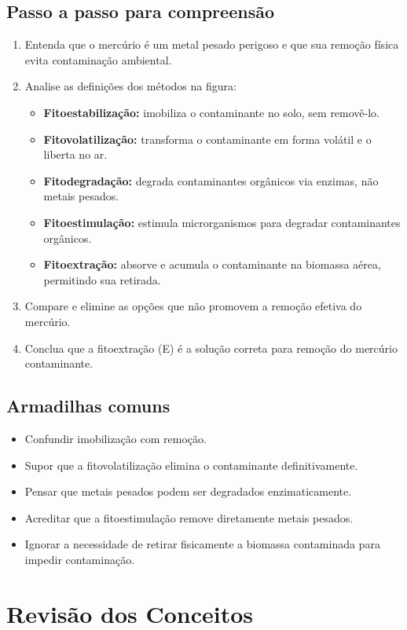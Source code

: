 \documentclass{article}
\begin{document}
\subsection*{Passo a passo para compreensão}
\begin{enumerate}
  \item Entenda que o mercúrio é um metal pesado perigoso e que sua remoção física evita contaminação ambiental.
  \item Analise as definições dos métodos na figura:
  \begin{itemize}
    \item \textbf{Fitoestabilização:} imobiliza o contaminante no solo, sem removê-lo.
    \item \textbf{Fitovolatilização:} transforma o contaminante em forma volátil e o liberta no ar.
    \item \textbf{Fitodegradação:} degrada contaminantes orgânicos via enzimas, não metais pesados.
    \item \textbf{Fitoestimulação:} estimula microrganismos para degradar contaminantes orgânicos.
    \item \textbf{Fitoextração:} absorve e acumula o contaminante na biomassa aérea, permitindo sua retirada.
  \end{itemize}
  \item Compare e elimine as opções que não promovem a remoção efetiva do mercúrio.
  \item Conclua que a fitoextração (E) é a solução correta para remoção do mercúrio contaminante.
\end{enumerate}

\subsection*{Armadilhas comuns}
\begin{itemize}
  \item Confundir imobilização com remoção.
  \item Supor que a fitovolatilização elimina o contaminante definitivamente.
  \item Pensar que metais pesados podem ser degradados enzimaticamente.
  \item Acreditar que a fitoestimulação remove diretamente metais pesados.
  \item Ignorar a necessidade de retirar fisicamente a biomassa contaminada para impedir contaminação.
\end{itemize}

\section*{Revisão dos Conceitos}
\end{document}
